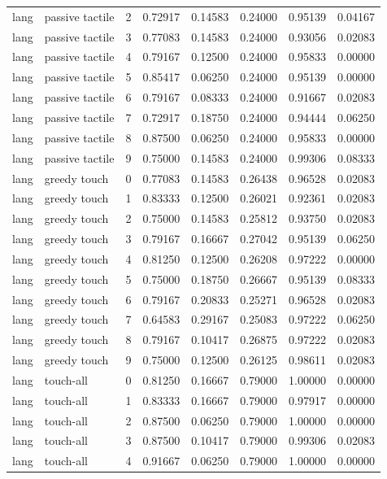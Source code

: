 \documentclass{article}
\begin{document}
\begin{center}
\begin{longtable}{llllllll}
lang & passive tactile & 2 & 0.72917 & 0.14583 & 0.24000 & 0.95139 & 0.04167 \\
lang & passive tactile & 3 & 0.77083 & 0.14583 & 0.24000 & 0.93056 & 0.02083 \\
lang & passive tactile & 4 & 0.79167 & 0.12500 & 0.24000 & 0.95833 & 0.00000 \\
lang & passive tactile & 5 & 0.85417 & 0.06250 & 0.24000 & 0.95139 & 0.00000 \\
lang & passive tactile & 6 & 0.79167 & 0.08333 & 0.24000 & 0.91667 & 0.02083 \\
lang & passive tactile & 7 & 0.72917 & 0.18750 & 0.24000 & 0.94444 & 0.06250 \\
lang & passive tactile & 8 & 0.87500 & 0.06250 & 0.24000 & 0.95833 & 0.00000 \\
lang & passive tactile & 9 & 0.75000 & 0.14583 & 0.24000 & 0.99306 & 0.08333 \\
lang & greedy touch & 0 & 0.77083 & 0.14583 & 0.26438 & 0.96528 & 0.02083 \\
lang & greedy touch & 1 & 0.83333 & 0.12500 & 0.26021 & 0.92361 & 0.02083 \\
lang & greedy touch & 2 & 0.75000 & 0.14583 & 0.25812 & 0.93750 & 0.02083 \\
lang & greedy touch & 3 & 0.79167 & 0.16667 & 0.27042 & 0.95139 & 0.06250 \\
lang & greedy touch & 4 & 0.81250 & 0.12500 & 0.26208 & 0.97222 & 0.00000 \\
lang & greedy touch & 5 & 0.75000 & 0.18750 & 0.26667 & 0.95139 & 0.08333 \\
lang & greedy touch & 6 & 0.79167 & 0.20833 & 0.25271 & 0.96528 & 0.02083 \\
lang & greedy touch & 7 & 0.64583 & 0.29167 & 0.25083 & 0.97222 & 0.06250 \\
lang & greedy touch & 8 & 0.79167 & 0.10417 & 0.26875 & 0.97222 & 0.02083 \\
lang & greedy touch & 9 & 0.75000 & 0.12500 & 0.26125 & 0.98611 & 0.02083 \\
lang & touch-all & 0 & 0.81250 & 0.16667 & 0.79000 & 1.00000 & 0.00000 \\
lang & touch-all & 1 & 0.83333 & 0.16667 & 0.79000 & 0.97917 & 0.00000 \\
lang & touch-all & 2 & 0.87500 & 0.06250 & 0.79000 & 1.00000 & 0.00000 \\
lang & touch-all & 3 & 0.87500 & 0.10417 & 0.79000 & 0.99306 & 0.02083 \\
lang & touch-all & 4 & 0.91667 & 0.06250 & 0.79000 & 1.00000 & 0.00000 \\

\end{longtable}
\end{center}
\end{document}
